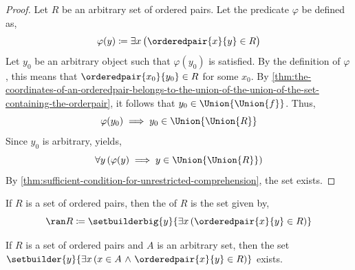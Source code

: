 \begin{proof}
    Let \( R \) be an arbitrary set of ordered pairs. Let the predicate \( \varphi \) be defined as,
    \begin{equation*}
        \varphi(y) \coloneq \exists x \, \big( \orderedpair{x}{y} \in R \big)
    \end{equation*}
    Let \( y_{0} \) be an arbitrary object such that \( \varphi(y_{0}) \) is satisfied. By the definition
    of \( \varphi \), this means that \( \orderedpair{x_{0}}{y_{0}} \in R \) for some \( x_{0} \). By
    \cref{thm:the-coordinates-of-an-orderedpair-belongs-to-the-union-of-the-union-of-the-set-containing-the-orderpair},
    it follows that \( y_{0} \in \Union{\Union{f}} \). Thus,
    \begin{equation*}
        \varphi(y_{0}) \implies y_{0} \in \Union{\Union{R}}
    \end{equation*}
    Since \( y_{0} \) is arbitrary,  yields,
    \begin{equation*}
        \forall y \, \mleft( \varphi(y) \implies y \in \Union{\Union{R}} \mright)
    \end{equation*}
    By \cref{thm:sufficient-condition-for-unrestricted-comprehension}, the set
     exists.
\end{proof}

\begin{dfn}[Range]
    \label{dfn:range-of-a-set-of-ordered-pairs}
    If \( R \) is a set of ordered pairs, then the  of \( R \) is the set given by,
    \begin{equation*}
        \ran R \coloneq \setbuilderbig{y}{\exists x \, \mleft( \orderedpair{x}{y} \in R \mright)}
    \end{equation*}
\end{dfn}

\begin{thm}
     \label{thm:existence-of-the-image-of-a-set-of-ordered-pairs-under-another-set}
    If \( R \) is a set of ordered pairs and \( A \) is an arbitrary set,
    then the set \( \setbuilder{y}{\exists x \, \mleft( x \in A \,\,{\land}\,\, \orderedpair{x}{y} \in R \mright)} \) exists.
\end{thm}

